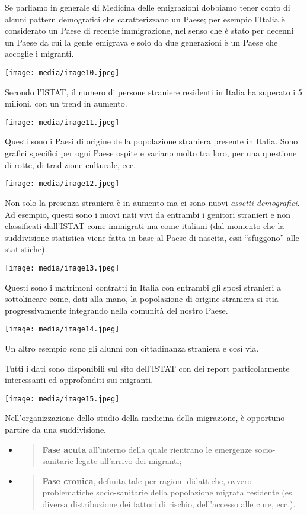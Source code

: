 \documentclass[]{article}
\begin{document}
Se parliamo in generale di Medicina delle emigrazioni dobbiamo tener
conto di alcuni pattern demografici che caratterizzano un Paese; per
esempio l'Italia è considerato un Paese di recente immigrazione, nel
senso che è stato per decenni un Paese da cui la gente emigrava e solo
da due generazioni è un Paese che accoglie i migranti.

\texttt{[image: media/image10.jpeg]}

Secondo l'ISTAT, il numero di persone straniere residenti in Italia ha
superato i 5 milioni, con un trend in aumento.

\texttt{[image: media/image11.jpeg]}

Questi sono i Paesi di origine della popolazione straniera presente in
Italia. Sono grafici specifici per ogni Paese ospite e variano molto tra
loro, per una questione di rotte, di tradizione culturale, ecc.

\texttt{[image: media/image12.jpeg]}

Non solo la presenza straniera è in aumento ma ci sono nuovi
\emph{assetti demografici}. Ad esempio, questi sono i nuovi nati vivi da
entrambi i genitori stranieri e non classificati dall'ISTAT come
immigrati ma come italiani (dal momento che la suddivisione statistica
viene fatta in base al Paese di nascita, essi ``sfuggono'' alle
statistiche).

\texttt{[image: media/image13.jpeg]}

Questi sono i matrimoni contratti in Italia con entrambi gli sposi
stranieri a sottolineare come, dati alla mano, la popolazione di origine
straniera si stia progressivamente integrando nella comunità del nostro
Paese.

\texttt{[image: media/image14.jpeg]}

Un altro esempio sono gli alunni con cittadinanza straniera e così via.

Tutti i dati sono disponibili sul sito dell'ISTAT con dei report
particolarmente interessanti ed approfonditi sui migranti.

\texttt{[image: media/image15.jpeg]}

Nell'organizzazione dello studio della medicina della migrazione, è
opportuno partire da una suddivisione.

\begin{itemize}
\item
  \begin{quote}
  \textbf{Fase acuta} all'interno della quale rientrano le emergenze
  socio-sanitarie legate all'arrivo dei migranti;
  \end{quote}
\item
  \begin{quote}
  \textbf{Fase cronica}, definita tale per ragioni didattiche, ovvero
  problematiche socio-sanitarie della popolazione migrata residente (es.
  diversa distribuzione dei fattori di rischio, dell'accesso alle cure,
  ecc.).
  \end{quote}
\end{itemize}
\end{document}
